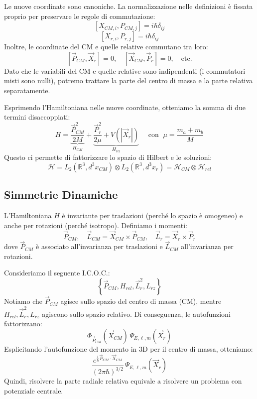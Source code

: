 Le nuove coordinate sono canoniche. La normalizzazione nelle definizioni è fissata proprio per preservare le regole di commutazione:
\[
[X_{CM, i}, P_{CM, j}] = i\hbar \delta_{ij}
\]
\[
[X_{r, i}, P_{r, j}] = i\hbar \delta_{ij}
\]
Inoltre, le coordinate del CM e quelle relative commutano tra loro:
\[
[\vec{P}_{CM}, \vec{X}_r] = 0, \quad [\vec{X}_{CM}, \vec{P}_r] = 0, \quad \text{etc.}
\]
Dato che le variabili del CM e quelle relative sono indipendenti (i commutatori misti sono nulli), potremo trattare la parte del centro di massa e la parte relativa separatamente.


Esprimendo l'Hamiltoniana nelle nuove coordinate, otteniamo la somma di due termini disaccoppiati:
\begin{equation}
    H = \underbrace{\frac{\vec{P}_{CM}^2}{2M}}_{H_{CM}} + \underbrace{\frac{\vec{P}_r^2}{2\mu} + V(|\vec{X}_r|)}_{H_{rel}} \quad \text{ con } \; \mu = \frac{m_a+m_b}{M}
\end{equation}
Questo ci permette di fattorizzare lo spazio di Hilbert e le soluzioni:
\begin{equation}
    \mathcal{H} = L_2(\mathbb{R}^3, d^3x_{CM}) \otimes L_2(\mathbb{R}^3, d^3x_r) = \mathcal{H}_{CM} \otimes \mathcal{H}_{rel}
\end{equation}

\subsection{Simmetrie Dinamiche}

L'Hamiltoniana \( H \) è invariante per traslazioni (perché lo spazio è omogeneo) e anche per rotazioni (perché isotropo).
Definiamo i momenti:
\[
\vec{P}_{CM}, \quad \vec{L}_{CM} = \vec{X}_{CM} \times \vec{P}_{CM}, \quad \vec{L}_r = \vec{X}_r \times \vec{P}_r
\]
dove \( \vec{P}_{CM} \) è associato all'invarianza per traslazioni e \( \vec{L}_{CM} \) all'invarianza per rotazioni.

Consideriamo il seguente I.C.O.C.:
\[
\left\{ \vec{P}_{CM}, H_{rel}, \vec{L}_r^2, L_{rz} \right\}
\]
Notiamo che \( \vec{P}_{CM} \) agisce sullo spazio del centro di massa (CM), mentre \( H_{rel}, \vec{L}_r^2, L_{rz} \) agiscono sullo spazio relativo.
Di conseguenza, le autofunzioni fattorizzano:
\begin{equation}
    \Phi_{\vec{P}_{CM}}(\vec{X}_{CM}) \, \Psi_{E,\ell,m}(\vec{X}_r)
\end{equation}
Esplicitando l'autofunzione del momento in 3D per il centro di massa, otteniamo:
\[
\frac{e^{\frac{i}{\hbar}\vec{P}_{CM}\cdot \vec{X}_{CM}}}{(2\pi\hbar)^{3/2}} \, {\Psi_{E,\ell,m}(\vec{X}_r)}
\]
Quindi, risolvere la parte radiale relativa equivale a risolvere un problema con potenziale centrale.

